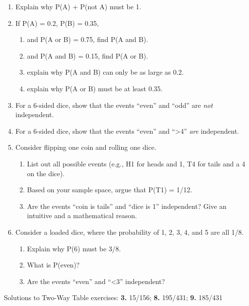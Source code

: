 \documentclass[
  letterpaper,
  DIV=11,
  numbers=noendperiod]{scrreprt}
\providecommand{\tightlist}{%
  \setlength{\itemsep}{0pt}\setlength{\parskip}{0pt}}\usepackage{longtable,booktabs,array}
\begin{document}
\begin{enumerate}
\def\labelenumi{\arabic{enumi}.}
\tightlist
\item
  Explain why P(A) + P(not A) must be 1.
\item
  If P(A) = 0.2, P(B) = 0.35,

  \begin{enumerate}
  \def\labelenumii{\alph{enumii}.}
  \tightlist
  \item
    and P(A or B) = 0.75, find P(A and B).
  \item
    and P(A and B) = 0.15, find P(A or B).
  \item
    explain why P(A and B) can only be as large as 0.2.
  \item
    explain why P(A or B) must be at least 0.35.
  \end{enumerate}
\item
  For a 6-sided dice, show that the events ``even'' and ``odd'' are
  \emph{not} independent.
\item
  For a 6-sided dice, show that the events ``even'' and
  ``\textgreater4'' \emph{are} independent.
\item
  Consider flipping one coin and rolling one dice.

  \begin{enumerate}
  \def\labelenumii{\alph{enumii}.}
  \tightlist
  \item
    List out all possible events (e.g., H1 for heads and 1, T4 for tails
    and a 4 on the dice).
  \item
    Based on your sample space, argue that P(T1) = 1/12.
  \item
    Are the events ``coin is tails'' and ``dice is 1'' independent? Give
    an intuitive and a mathematical reason.
  \end{enumerate}
\item
  Consider a loaded dice, where the probability of 1, 2, 3, 4, and 5 are
  all 1/8.

  \begin{enumerate}
  \def\labelenumii{\alph{enumii}.}
  \tightlist
  \item
    Explain why P(6) must be 3/8.
  \item
    What is P(even)?
  \item
    Are the events ``even'' and ``\textless3'' independent?
  \end{enumerate}
\end{enumerate}

Solutions to Two-Way Table exercises: \textbf{3.} 15/156; \textbf{8.}
195/431; \textbf{9.} 185/431
\end{document}
